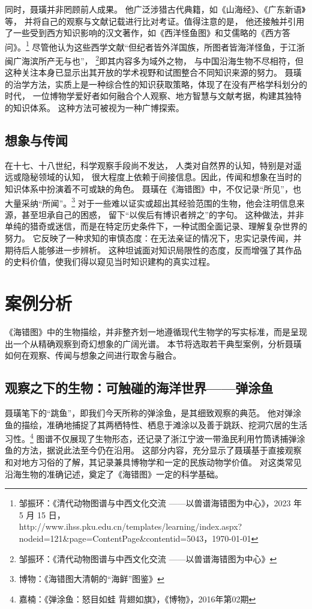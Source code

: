 \documentclass{source/Paper}
\begin{document}
同时，聂璜并非罔顾前人成果。
他广泛涉猎古代典籍，如《山海经》、《广东新语》等，
并将自己的观察与文献记载进行比对考证。值得注意的是，
他还接触并引用了一些受到西方知识影响的汉文著作，如《西洋怪鱼图》和艾儒略的《西方答问》。\footnote{邹振环：《清代动物图谱与中西文化交流 ——以\textlangle 兽谱\textrangle \textlangle 海错图\textrangle 为中心》，2023 年 5 月 15 日，\\http://www.ihss.pku.edu.cn/templates/learning/index.aspx?nodeid=121\&page=ContentPage\&contentid=5043，\today}
尽管他认为这些西学文献“但纪者皆外洋国族，所图者皆海洋怪鱼，于江浙闽广海滨所产无与也”，
\footnote{邹振环：《清代动物图谱与中西文化交流 ——以\textlangle 兽谱\textrangle \textlangle 海错图\textrangle 为中心》}即其内容多为域外之物，
与中国沿海生物不尽相符，但这种关注本身已显示出其开放的学术视野和试图整合不同知识来源的努力。
聂璜的治学方法，实质上是一种综合性的知识获取策略，体现了在没有严格学科划分的时代，
一位博物学爱好者如何融合个人观察、地方智慧与文献考据，构建其独特的知识体系。
这种方法可被视为一种广博探索。

\subsection{想象与传闻}
在十七、十八世纪，科学观察手段尚不发达，
人类对自然界的认知，特别是对遥远或隐秘领域的认知，
很大程度上依赖于间接信息。因此，传闻和想象在当时的知识体系中扮演着不可或缺的角色。
聂璜在《海错图》中，不仅记录“所见”，也大量采纳“所闻”。\footnote{博物：《\textlangle 海错图\textrangle 大清朝的“海鲜”图鉴》}
对于一些难以证实或超出其经验范围的生物，他会注明信息来源，甚至坦承自己的困惑，
留下“以俟后有博识者辨之”的字句。
这种做法，并非单纯的猎奇或迷信，而是在特定历史条件下，一种试图全面记录、理解复杂世界的努力。
它反映了一种求知的审慎态度：在无法亲证的情况下，忠实记录传闻，并期待后人能够进一步辨析。
这种坦诚面对知识局限性的态度，反而增强了其作品的史料价值，使我们得以窥见当时知识建构的真实过程。

\section{案例分析}
《海错图》中的生物描绘，并非整齐划一地遵循现代生物学的写实标准，而是呈现出一个从精确观察到奇幻想象的广阔光谱。
本节将选取若干典型案例，分析聂璜如何在观察、传闻与想象之间进行取舍与融合。
\subsection{观察之下的生物：可触碰的海洋世界——弹涂鱼}
聂璜笔下的“跳鱼”，即我们今天所称的弹涂鱼，是其细致观察的典范。
他对弹涂鱼的描绘，准确地捕捉了其两栖特性、栖息于滩涂以及善于跳跃、挖洞穴居的生活习性。\footnote{嘉楠：《弹涂鱼：怒目如蛙 背翅如旗》，《博物》，2016年第02期}
图谱不仅展现了生物形态，还记录了浙江宁波一带渔民利用竹筒诱捕弹涂鱼的方法，据说此法至今仍在沿用。
这部分内容，充分显示了聂璜基于直接观察和对地方习俗的了解，其记录兼具博物学和一定的民族动物学价值。
对这类常见沿海生物的准确记述，奠定了《海错图》一定的科学基础。
\end{document}
